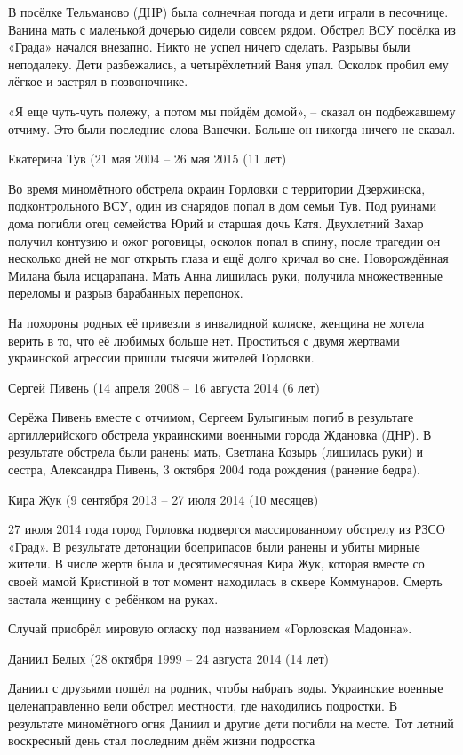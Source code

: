 В посёлке Тельманово (ДНР) была солнечная погода и дети играли в песочнице.
Ванина мать с маленькой дочерью сидели совсем рядом. Обстрел ВСУ посёлка из
«Града» начался внезапно. Никто не успел ничего сделать. Разрывы были
неподалеку. Дети разбежались, а четырёхлетний Ваня упал. Осколок пробил ему
лёгкое и застрял в позвоночнике.

«Я еще чуть-чуть полежу, а потом мы пойдём домой», – сказал он подбежавшему
отчиму. Это были последние слова Ванечки. Больше он никогда ничего не сказал.

Екатерина Тув (21 мая 2004 – 26 мая 2015 (11 лет)

Во время миномётного обстрела окраин Горловки с территории Дзержинска,
подконтрольного ВСУ, один из снарядов попал в дом семьи Тув. Под руинами дома
погибли отец семейства Юрий и старшая дочь Катя. Двухлетний Захар получил
контузию и ожог роговицы, осколок попал в спину, после трагедии он несколько
дней не мог открыть глаза и ещё долго кричал во сне. Новорождённая Милана была
исцарапана. Мать Анна лишилась руки, получила множественные переломы и разрыв
барабанных перепонок.

На похороны родных её привезли в инвалидной коляске, женщина не хотела верить в
то, что её любимых больше нет. Проститься с двумя жертвами украинской агрессии
пришли тысячи жителей Горловки.

Сергей Пивень (14 апреля 2008 – 16 августа 2014 (6 лет)

Серёжа Пивень вместе с отчимом, Сергеем Булыгиным погиб в результате
артиллерийского обстрела украинскими военными города Ждановка (ДНР). В
результате обстрела были ранены мать, Светлана Козырь (лишилась руки) и сестра,
Александра Пивень, 3 октября 2004 года рождения (ранение бедра).

Кира Жук (9 сентября 2013 – 27 июля 2014 (10 месяцев)

27 июля 2014 года город Горловка подвергся массированному обстрелу из РЗСО
«Град». В результате детонации боеприпасов были ранены и убиты мирные жители. В
числе жертв была и десятимесячная Кира Жук, которая вместе со своей мамой
Кристиной в тот момент находилась в сквере Коммунаров. Смерть застала женщину с
ребёнком на руках.

Случай приобрёл мировую огласку под названием «Горловская Мадонна».

Даниил Белых (28 октября 1999 – 24 августа 2014 (14 лет)

Даниил с друзьями пошёл на родник, чтобы набрать воды. Украинские военные
целенаправленно вели обстрел местности, где находились подростки. В результате
миномётного огня Даниил и другие дети погибли на месте. Тот летний воскресный
день стал последним днём жизни подростка

